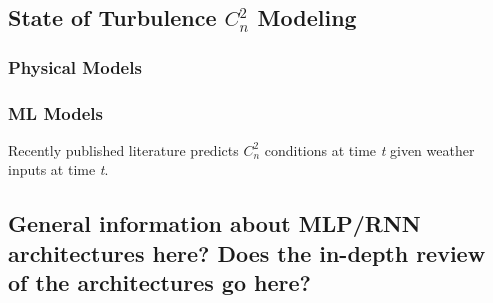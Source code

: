 \subsection{State of Turbulence $C_{n}^{2}$ Modeling}
\subsubsection{Physical Models}
\subsubsection{ML Models}
Recently published literature predicts $C_{n}^{2}$ conditions at time \textit{t} given weather inputs at time \textit{t}.
\subsection{General information about MLP/RNN architectures here? Does the in-depth review of the architectures go here?}